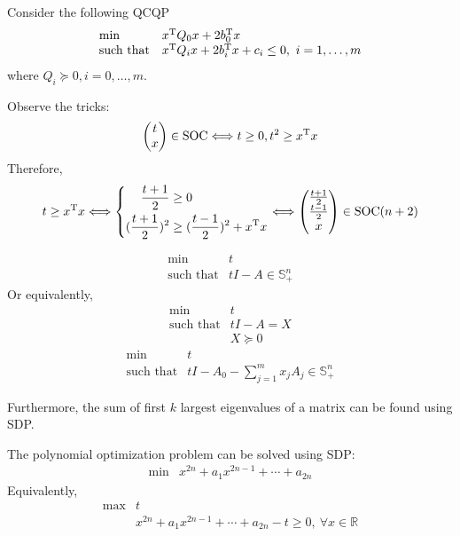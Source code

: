 \begin{example}[QCQP]
Consider the following QCQP
\[
\begin{array}{ll}
\min&x^{\mathrm T} Q_0x+2b_0^{\mathrm T} x\\
\mbox{such that}&x^{\mathrm T} Q_ix+2b_i^{\mathrm T} x+c_i\le0,\ i=1,\dots,m
\end{array}
\]
where $Q_i\succeq0,i=0,\dots,m$.

Observe the tricks:
\[
\begin{pmatrix}
t\\ x
\end{pmatrix}\in\text{SOC}
\Longleftrightarrow
t\ge0, t^2\ge x^{\mathrm T} x
\]
Therefore,
\[
t\ge x^{\mathrm T} x\Longleftrightarrow
\left\{
\begin{aligned}
\frac{t+1}{2}&\ge0\\
(\frac{t+1}{2})^2&\ge(\frac{t-1}{2})^2+x^{\mathrm T} x
\end{aligned}
\right.
\Longleftrightarrow
\begin{pmatrix}
\frac{t+1}{2}\\\frac{t-1}{2}\\x
\end{pmatrix}\in\text{SOC}(n+2)
\]
\end{example}
\begin{example}
\[
\begin{array}{ll}
\min&t\\
\mbox{such that}&tI-A\in\mathbb{S}^n_+
\end{array}
\]
Or equivalently,
\[
\begin{array}{ll}
\min&t\\
\mbox{such that}&tI-A=X\\
&X\succeq0
\end{array}
\]
\[
\begin{array}{ll}
\min&t\\
\text{such that}&tI-A_0-\sum_{j=1}^mx_jA_j\in\mathbb{S}^n_+
\end{array}
\]

Furthermore, the sum of first $k$ largest eigenvalues of a matrix can be found using SDP.
\end{example}

\begin{example}
The polynomial optimization problem can be solved using SDP:
\[
\begin{array}{ll}
\min&x^{2n}+a_1x^{2n-1}+\cdots+a_{2n}
\end{array}
\]
Equivalently,
\[
\begin{array}{ll}
\max&t\\
&x^{2n}+a_1x^{2n-1}+\cdots+a_{2n}-t\ge0,\ \forall x\in\mathbb{R}
\end{array}
\]
\end{example}




